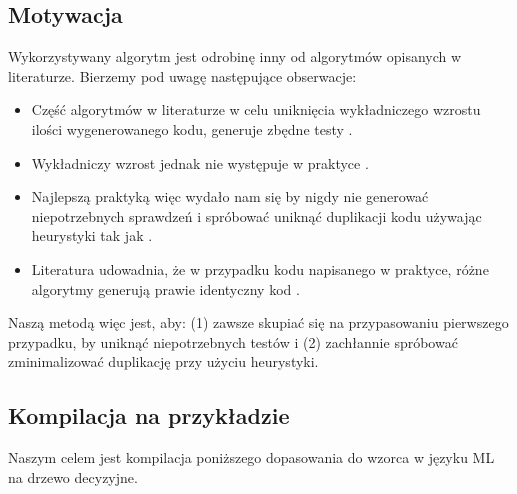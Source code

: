 \documentclass{article}
\begin{document}
\subsection{Motywacja}
Wykorzystywany algorytm jest odrobinę inny od algorytmów opisanych w literaturze. Bierzemy pod uwagę następujące obserwacje:
\begin{itemize}
  \item Część algorytmów w literaturze w celu uniknięcia wykładniczego wzrostu ilości wygenerowanego kodu, generuje zbędne testy \cite{Augustsson__1985}.
  \item Wykładniczy wzrost jednak nie występuje w praktyce \cite{Scott__Ramsey__2000}.
  \item Najlepszą praktyką więc wydało nam się by nigdy nie generować niepotrzebnych sprawdzeń i spróbować uniknąć duplikacji kodu używając heurystyki tak jak \cite{Maranget__2008}.
  \item Literatura udowadnia, że w przypadku kodu napisanego w praktyce, różne algorytmy generują prawie identyczny kod \cite{Scott__Ramsey__2000, Maranget__2008}.
\end{itemize}
  Naszą metodą więc jest, aby: (1) zawsze skupiać się na przypasowaniu pierwszego przypadku, by uniknąć niepotrzebnych testów i (2) zachłannie spróbować zminimalizować duplikację przy użyciu heurystyki.

\subsection{Kompilacja na przykładzie}
Naszym celem jest kompilacja poniższego dopasowania do wzorca w języku ML na drzewo decyzyjne.
\end{document}
